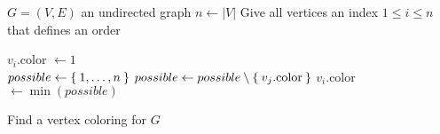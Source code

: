 \documentclass{article}
\begin{document}
\begin{preview}
    \begin{algorithm}[H]
        \begin{algorithmic}
            \Require $G = (V, E)$ an undirected graph
            \State $n \gets |V|$
            \State Give all vertices an index $1 \leq i \leq n$ that defines an order

                \State $v_i$.color $\gets 1$
            \EndFor
            \\
                \State $possible \gets \Set{1, \dots, n}$
                        \State $possible \gets possible \setminus \Set{v_j.\text{color}}$
                    \EndIf
                \EndFor
                \State $v_i$.color $\gets \min(possible)$
            \EndFor
        \end{algorithmic}
    \caption{Find a vertex coloring for $G$}
    \label{alg:vertexColoring}
    \end{algorithm}
\end{preview}
\end{document}
